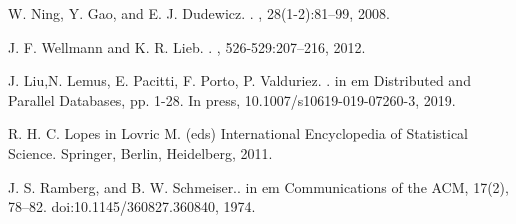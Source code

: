 \documentclass[11pt]{article}
\begin{document}
\begin{thebibliography}{10}
\begin{small}
W. Ning, Y. Gao, and E. J. Dudewicz.
.
,
  28(1-2):81--99, 2008.
  
J. F. Wellmann and K. R. Lieb.
.
, 526-529:207--216, 2012.

J. Liu,N. Lemus, E. Pacitti, F. Porto, P.  Valduriez. . \newblock in {em Distributed and Parallel Databases}, pp. 1-28. In press, 10.1007/s10619-019-07260-3, 2019.

R. H. C. Lopes   \newblock in {Lovric M. (eds) International Encyclopedia of Statistical Science. Springer, Berlin, Heidelberg}, 2011.

 J. S. Ramberg, and B. W. Schmeiser.. \newblock in {em Communications of the ACM}, 17(2), 78–82.
doi:10.1145/360827.360840, 1974.


\end{small}
 \end{thebibliography}
\end{document}
